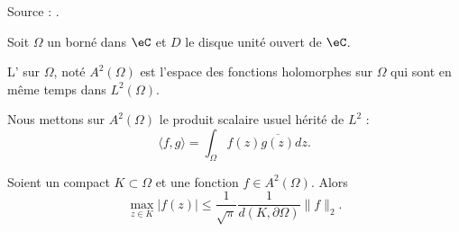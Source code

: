 Source : \cite{ytMOpe}.

Soit \( \Omega\) un borné dans \( \eC\) et \( D\) le disque unité ouvert de \( \eC\).

\begin{definition}
	L' sur \( \Omega\), noté \( A^2(\Omega)\) est l'espace des fonctions holomorphes sur \( \Omega\) qui sont en même temps dans \( L^2(\Omega)\).
\end{definition}
Nous mettons sur \( A^2(\Omega)\) le produit scalaire usuel hérité de \( L^2\) :
\begin{equation}
	\langle f, g\rangle =\int_{\Omega}f(z)\overline{ g(z) }dz.
\end{equation}

\begin{lemma}   \label{LemIZxKfB}
	Soient un compact \( K\subset \Omega\) et une fonction \( f\in A^2(\Omega)\). Alors
	\begin{equation}
		\max_{z\in K}| f(z) |\leq \frac{1}{ \sqrt{\pi} }\frac{1}{ d(K,\partial \Omega) }\| f \|_2.
	\end{equation}
\end{lemma}

